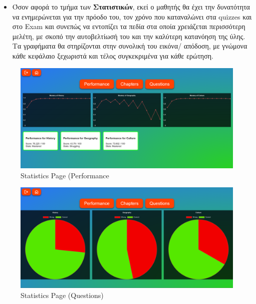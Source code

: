 \begin{itemize}
    \item Όσον αφορά το τμήμα των \textbf{Στατιστικών}, εκεί ο μαθητής θα έχει την δυνατότητα να ενημερώνεται για την πρόοδο του, τον χρόνο που καταναλώνει στα \textlatin{quizzes} και στο \textlatin{Exam} και συνεπώς να εντοπίζει τα πεδία στα οποία χρειάζεται περισσότερη μελέτη, με σκοπό την αυτοβελτίωσή του και την καλύτερη κατανόηση της ύλης. Τα γραφήματα θα στηρίζονται στην συνολική του εικόνα/ απόδοση, με γνώμονα κάθε κεφάλαιο ξεχωριστά και τέλος συγκεκριμένα για κάθε ερώτηση.
\end{itemize}
\begin{figure}[H]
    \centering
    \includegraphics[width=0.5\linewidth]{img/Statistics.png}
    \caption{\textlatin{Statistics Page (Performance}}
\end{figure}
\begin{figure}[H]
    \centering
    \includegraphics[width=0.5\linewidth]{img/Statistics-Quests.png}
    \caption{\textlatin{Statistics Page (Questions)}}
\end{figure}
